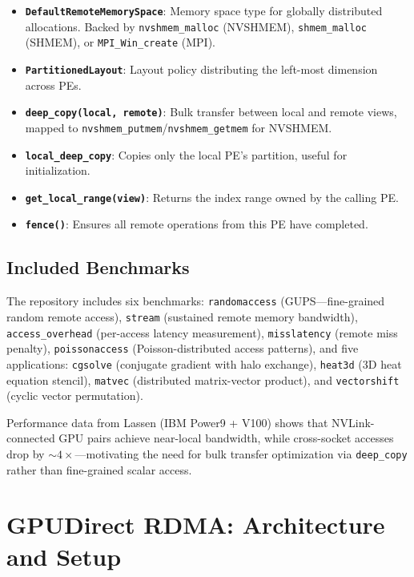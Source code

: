\documentclass[11pt,letterpaper]{article}
\begin{document}
\begin{itemize}[noitemsep]
    \item \textbf{\texttt{DefaultRemoteMemorySpace}}: Memory space type for globally distributed allocations. Backed by \texttt{nvshmem\_malloc} (NVSHMEM), \texttt{shmem\_malloc} (SHMEM), or \texttt{MPI\_Win\_create} (MPI).
    \item \textbf{\texttt{PartitionedLayout}}: Layout policy distributing the left-most dimension across PEs.
    \item \textbf{\texttt{deep\_copy(local, remote)}}: Bulk transfer between local and remote views, mapped to \texttt{nvshmem\_putmem}/\texttt{nvshmem\_getmem} for NVSHMEM.
    \item \textbf{\texttt{local\_deep\_copy}}: Copies only the local PE's partition, useful for initialization.
    \item \textbf{\texttt{get\_local\_range(view)}}: Returns the index range owned by the calling PE.
    \item \textbf{\texttt{fence()}}: Ensures all remote operations from this PE have completed.
\end{itemize}

\subsection{Included Benchmarks}

The repository includes six benchmarks: \texttt{randomaccess} (GUPS---fine-grained random remote access), \texttt{stream} (sustained remote memory bandwidth), \texttt{access\_overhead} (per-access latency measurement), \texttt{misslatency} (remote miss penalty), \texttt{poissonaccess} (Poisson-distributed access patterns), and five applications: \texttt{cgsolve} (conjugate gradient with halo exchange), \texttt{heat3d} (3D heat equation stencil), \texttt{matvec} (distributed matrix-vector product), and \texttt{vectorshift} (cyclic vector permutation).

Performance data from Lassen (IBM Power9 + V100) shows that NVLink-connected GPU pairs achieve near-local bandwidth, while cross-socket accesses drop by ${\sim}4\times$---motivating the need for bulk transfer optimization via \texttt{deep\_copy} rather than fine-grained scalar access.

\section{GPUDirect RDMA: Architecture and Setup}
\label{sec:gpudirect}
\end{document}

